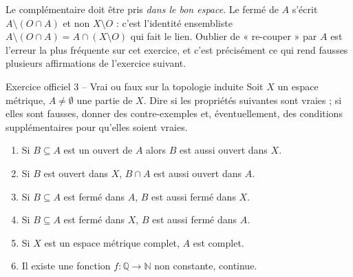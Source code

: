 \documentclass[11pt,a4paper]{article}
\newcommand{\N}{\mathbb{N}}
\newcommand{\Q}{\mathbb{Q}}
\theoremstyle{definition}
\begin{document}
\begin{piege}
Le complémentaire doit être pris \emph{dans le bon espace}. Le fermé de $A$ s'écrit $A\setminus(O\cap A)$ et non $X\setminus O$ : c'est l'identité ensembliste $A\setminus(O\cap A)=A\cap(X\setminus O)$ qui fait le lien. Oublier de « re-couper » par $A$ est l'erreur la plus fréquente sur cet exercice, et c'est précisément ce qui rend fausses plusieurs affirmations de l'exercice suivant.
\end{piege}

\begin{exo}{Exercice officiel 3 -- Vrai ou faux sur la topologie induite}
Soit $X$ un espace métrique, $A\neq\emptyset$ une partie de $X$. Dire si les propriétés suivantes sont vraies ; si elles sont fausses, donner des contre-exemples et, éventuellement, des conditions supplémentaires pour qu'elles soient vraies.
\begin{enumerate}[label=\arabic*.]
  \item Si $B\subseteq A$ est un ouvert de $A$ alors $B$ est aussi ouvert dans $X$.
  \item Si $B$ est ouvert dans $X$, $B\cap A$ est aussi ouvert dans $A$.
  \item Si $B\subseteq A$ est fermé dans $A$, $B$ est aussi fermé dans $X$.
  \item Si $B\subseteq A$ est fermé dans $X$, $B$ est aussi fermé dans $A$.
  \item Si $X$ est un espace métrique complet, $A$ est complet.
  \item Il existe une fonction $f:\Q\to\N$ non constante, continue.
\end{enumerate}
\end{exo}
\end{document}
